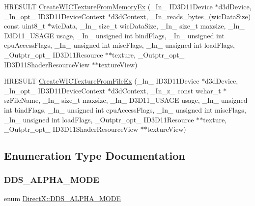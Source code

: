 \begin{DoxyCompactItemize}
\item 
H\+R\+E\+S\+U\+LT \hyperlink{namespace_direct_x_ae20d2e1ac1ab3927c6bf8873b67e8b4b}{Create\+W\+I\+C\+Texture\+From\+Memory\+Ex} (\+\_\+\+In\+\_\+ I\+D3\+D11\+Device $\ast$d3d\+Device, \+\_\+\+In\+\_\+opt\+\_\+ I\+D3\+D11\+Device\+Context $\ast$d3d\+Context, \+\_\+\+In\+\_\+reads\+\_\+bytes\+\_\+(wic\+Data\+Size) const uint8\+\_\+t $\ast$wic\+Data, \+\_\+\+In\+\_\+ size\+\_\+t wic\+Data\+Size, \+\_\+\+In\+\_\+ size\+\_\+t maxsize, \+\_\+\+In\+\_\+ D3\+D11\+\_\+\+U\+S\+A\+GE usage, \+\_\+\+In\+\_\+ unsigned int bind\+Flags, \+\_\+\+In\+\_\+ unsigned int cpu\+Access\+Flags, \+\_\+\+In\+\_\+ unsigned int misc\+Flags, \+\_\+\+In\+\_\+ unsigned int load\+Flags, \+\_\+\+Outptr\+\_\+opt\+\_\+ I\+D3\+D11\+Resource $\ast$$\ast$texture, \+\_\+\+Outptr\+\_\+opt\+\_\+ I\+D3\+D11\+Shader\+Resource\+View $\ast$$\ast$texture\+View)
\item 
H\+R\+E\+S\+U\+LT \hyperlink{namespace_direct_x_add6a4b3cabfab65339e9816320bf2f5a}{Create\+W\+I\+C\+Texture\+From\+File\+Ex} (\+\_\+\+In\+\_\+ I\+D3\+D11\+Device $\ast$d3d\+Device, \+\_\+\+In\+\_\+opt\+\_\+ I\+D3\+D11\+Device\+Context $\ast$d3d\+Context, \+\_\+\+In\+\_\+z\+\_\+ const wchar\+\_\+t $\ast$sz\+File\+Name, \+\_\+\+In\+\_\+ size\+\_\+t maxsize, \+\_\+\+In\+\_\+ D3\+D11\+\_\+\+U\+S\+A\+GE usage, \+\_\+\+In\+\_\+ unsigned int bind\+Flags, \+\_\+\+In\+\_\+ unsigned int cpu\+Access\+Flags, \+\_\+\+In\+\_\+ unsigned int misc\+Flags, \+\_\+\+In\+\_\+ unsigned int load\+Flags, \+\_\+\+Outptr\+\_\+opt\+\_\+ I\+D3\+D11\+Resource $\ast$$\ast$texture, \+\_\+\+Outptr\+\_\+opt\+\_\+ I\+D3\+D11\+Shader\+Resource\+View $\ast$$\ast$texture\+View)
\end{DoxyCompactItemize}


\subsection{Enumeration Type Documentation}
\hypertarget{namespace_direct_x_a7cb48689d75471680c0bf7f79caaaf1f}{}\label{namespace_direct_x_a7cb48689d75471680c0bf7f79caaaf1f} 
\subsubsection{\texorpdfstring{D\+D\+S\+\_\+\+A\+L\+P\+H\+A\+\_\+\+M\+O\+DE}{DDS\_ALPHA\_MODE}}
{\footnotesize\ttfamily enum \hyperlink{namespace_direct_x_a7cb48689d75471680c0bf7f79caaaf1f}{Direct\+X\+::\+D\+D\+S\+\_\+\+A\+L\+P\+H\+A\+\_\+\+M\+O\+DE}}

